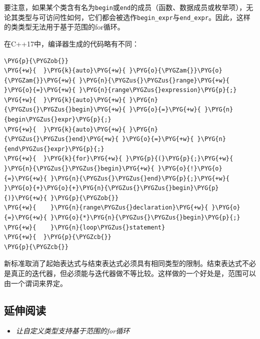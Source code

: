 
要注意，如果某个类含有名为\texttt{begin}或\texttt{end}的成员（函数、数据成员或枚举项），无论其类型与可访问性如何，它们都会被选作\texttt{begin\_\allowbreak{}expr}与\texttt{end\_\allowbreak{}expr}。因此，这样的类类型无法用于基于范围的for循环。



在C++17中，编译器生成的代码略有不同：



\begin{codeblockbg}
\begin{Verbatim}[commandchars=\\\{\},breaklines=true,breakanywhere=true,fontsize=\codefont,xleftmargin=17bp]
\PYG{p}{\PYGZob{}}
\PYG{+w}{  }\PYG{k}{auto}\PYG{+w}{ }\PYG{o}{\PYGZam{}}\PYG{o}{\PYGZam{}}\PYG{+w}{ }\PYG{n}{\PYGZus{}\PYGZus{}range}\PYG{+w}{ }\PYG{o}{=}\PYG{+w}{ }\PYG{n}{range\PYGZus{}expression}\PYG{p}{;}
\PYG{+w}{  }\PYG{k}{auto}\PYG{+w}{ }\PYG{n}{\PYGZus{}\PYGZus{}begin}\PYG{+w}{ }\PYG{o}{=}\PYG{+w}{ }\PYG{n}{begin\PYGZus{}expr}\PYG{p}{;}
\PYG{+w}{  }\PYG{k}{auto}\PYG{+w}{ }\PYG{n}{\PYGZus{}\PYGZus{}end}\PYG{+w}{ }\PYG{o}{=}\PYG{+w}{ }\PYG{n}{end\PYGZus{}expr}\PYG{p}{;}
\PYG{+w}{  }\PYG{k}{for}\PYG{+w}{ }\PYG{p}{(}\PYG{p}{;}\PYG{+w}{ }\PYG{n}{\PYGZus{}\PYGZus{}begin}\PYG{+w}{ }\PYG{o}{!}\PYG{o}{=}\PYG{+w}{ }\PYG{n}{\PYGZus{}\PYGZus{}end}\PYG{p}{;}\PYG{+w}{ }\PYG{o}{+}\PYG{o}{+}\PYG{n}{\PYGZus{}\PYGZus{}begin}\PYG{p}{)}\PYG{+w}{ }\PYG{p}{\PYGZob{}}
\PYG{+w}{    }\PYG{n}{range\PYGZus{}declaration}\PYG{+w}{ }\PYG{o}{=}\PYG{+w}{ }\PYG{o}{*}\PYG{n}{\PYGZus{}\PYGZus{}begin}\PYG{p}{;}
\PYG{+w}{    }\PYG{n}{loop\PYGZus{}statement}
\PYG{+w}{  }\PYG{p}{\PYGZcb{}}
\PYG{p}{\PYGZcb{}}
\end{Verbatim}
\end{codeblockbg}



新标准取消了起始表达式与结束表达式必须具有相同类型的限制。结束表达式不必是真正的迭代器，但必须能与迭代器做不等比较。这样做的一个好处是，范围可以由一个谓词来界定。



\subsection{延伸阅读}



\begin{itemize}
\item \textit{让自定义类型支持基于范围的for循环}

\end{itemize}


